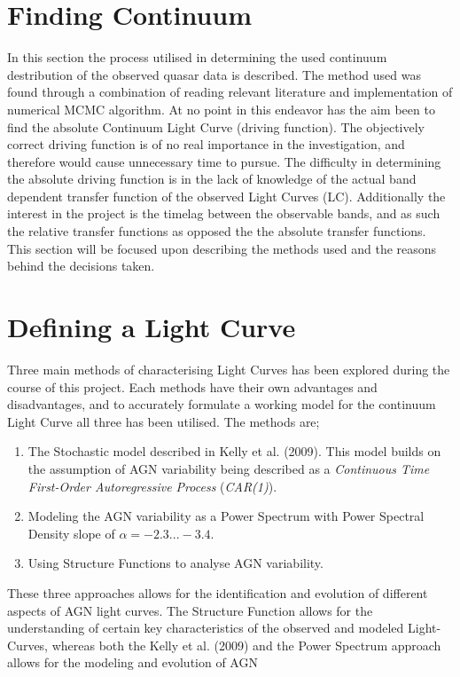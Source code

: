 \documentclass[a4paper, 12pt, twoside]{article}
\begin{document}
\section{Finding Continuum}
In this section the process utilised in determining the used continuum destribution of the observed quasar data is described. The method used was found through a combination of reading relevant literature and implementation of numerical MCMC algorithm. At no point in this endeavor has the aim been to find the absolute Continuum Light Curve (driving function). The objectively correct driving function is of no real importance in the investigation, and therefore would cause unnecessary time to pursue. The difficulty in determining the absolute driving function is in the lack of knowledge of the actual band dependent transfer function of the observed Light Curves (LC). Additionally the interest in the project is the timelag between the observable bands, and as such the relative transfer functions as opposed the the absolute transfer functions. \\
This section will be focused upon describing the methods used and the reasons behind the decisions taken.\\

\section{Defining a Light Curve}
Three main methods of characterising Light Curves has been explored during the course of this project. Each methods have their own advantages and disadvantages, and to accurately formulate a working model for the continuum Light Curve all three has been utilised. The methods are;
\begin{enumerate}
\item The Stochastic model described in Kelly et al. (2009). This model builds on the assumption of AGN variability being described as a \emph{Continuous Time First-Order Autoregressive Process} (\emph{CAR(1)}).
\item Modeling the AGN variability as a Power Spectrum with Power Spectral Density slope of $\alpha=-2.3...-3.4$.
\item Using Structure Functions to analyse AGN variability.
\end{enumerate}
These three approaches allows for the identification and evolution of different aspects of AGN light curves. The Structure Function allows for the understanding of certain key characteristics of the observed and modeled Light-Curves, whereas both the Kelly et al. (2009) and the Power Spectrum approach allows for the modeling and evolution of AGN 
\end{document}
